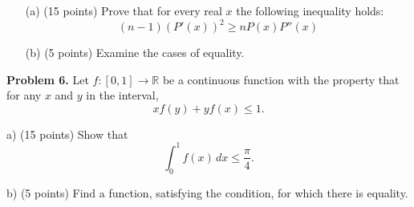 \documentclass{article}
\begin{document}
\begin{enumerate}
    \item[(a)] (15 points) Prove that for every real \( x \) the following inequality holds:
    \begin{equation}
        (n - 1)\left({P'(x)}\right)^2 \geq n{P(x)}{P''(x)}
    \end{equation}
    \item[(b)] (5 points) Examine the cases of equality.
\end{enumerate}

\textbf{Problem 6.} Let \( f : [0,1] \rightarrow \mathbb{R} \)
be a continuous function with the property that for any \( x \) and \( y \) in the interval,
\[
xf(y)+yf(x) \leq 1.
\]

a) (15 points) Show that
\[
\int_{0}^{1} f(x) \, dx \leq \frac{\pi}{4}.
\]

b) (5 points) Find a function, satisfying the condition, for which there is equality.
\end{document}
